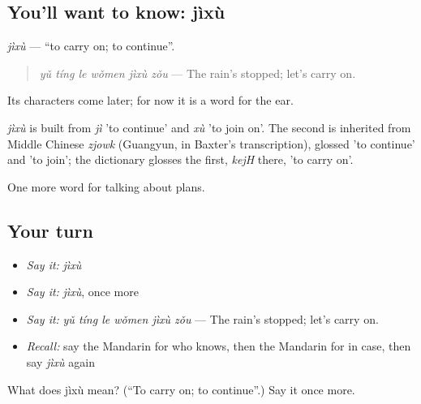\subsection*{You'll want to know: jìxù}
\emph{jìxù} — \textquotedblleft{}to carry on; to continue\textquotedblright{}.

\begin{quote}
\emph{yǔ tíng le wǒmen jìxù zǒu} — The rain's stopped; let's carry on.
\end{quote}

Its characters come later; for now it is a word for the ear.

\begin{cousinweb}
\emph{jìxù} is built from \emph{jì} 'to continue' and \emph{xù} 'to join on'. The second is inherited from Middle Chinese \emph{zjowk} (Guangyun, in Baxter's transcription), glossed 'to continue' and 'to join'; the dictionary glosses the first, \emph{kejH} there, 'to carry on'.
\end{cousinweb}

\begin{grammarlens}[title={What you've built}]
One more word for talking about plans.
\end{grammarlens}

\subsection*{Your turn}
\begin{itemize}
\raggedright
  \item \emph{Say it:} \emph{jìxù}
  \item \emph{Say it:} \emph{jìxù}, once more
  \item \emph{Say it:} \emph{yǔ tíng le wǒmen jìxù zǒu} — The rain's stopped; let's carry on.
  \item \emph{Recall:} say the Mandarin for who knows, then the Mandarin for in case, then say \emph{jìxù} again
\end{itemize}

\begin{tcolorbox}[breakable,colback=teal!4,colframe=teal!35!black,title={Before you move on}]
What does jìxù mean? (\textquotedblleft{}To carry on; to continue\textquotedblright{}.) Say it once more.
\end{tcolorbox}
